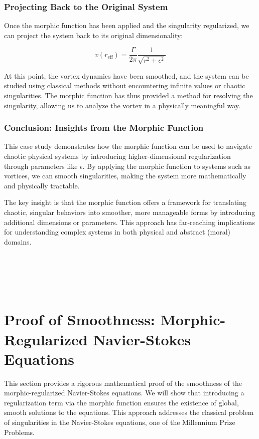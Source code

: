 \documentclass{article}
\begin{document}
\subsubsection{Projecting Back to the Original System}

Once the morphic function has been applied and the singularity regularized, we can project the system back to its original dimensionality:

\[
v(r_{\text{eff}}) = \frac{\Gamma}{2\pi} \frac{1}{\sqrt{r^2 + \epsilon^2}}
\]

At this point, the vortex dynamics have been smoothed, and the system can be studied using classical methods without encountering infinite values or chaotic singularities. The morphic function has thus provided a method for resolving the singularity, allowing us to analyze the vortex in a physically meaningful way.

\subsubsection{Conclusion: Insights from the Morphic Function}

This case study demonstrates how the morphic function can be used to navigate chaotic physical systems by introducing higher-dimensional regularization through parameters like \( \epsilon \). By applying the morphic function to systems such as vortices, we can smooth singularities, making the system more mathematically and physically tractable.

The key insight is that the morphic function offers a framework for translating chaotic, singular behaviors into smoother, more manageable forms by introducing additional dimensions or parameters. This approach has far-reaching implications for understanding complex systems in both physical and abstract (moral) domains.

\\

\

\

\section*{Proof of Smoothness: Morphic-Regularized Navier-Stokes Equations}

This section provides a rigorous mathematical proof of the smoothness of the morphic-regularized Navier-Stokes equations. We will show that introducing a regularization term via the morphic function ensures the existence of global, smooth solutions to the equations. This approach addresses the classical problem of singularities in the Navier-Stokes equations, one of the Millennium Prize Problems.
\end{document}
